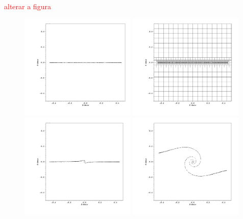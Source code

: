 \documentclass[review]{elsarticle}
\begin{document}
\textcolor{red}{alterar a figura}
\begin{figure}[!ht]
  \begin{center}
    \includegraphics[width=0.49\textwidth]{figure/visit0371.pdf}
    \includegraphics[width=0.49\textwidth]{figure/visit0027.pdf}
    \vspace{-2pc}
    \includegraphics[width=0.49\textwidth]{figure/visit0365.pdf}
    \includegraphics[width=0.49\textwidth]{figure/visit0250.pdf}

\end{center}
\end{figure}
\end{document}
